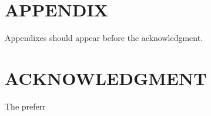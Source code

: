 \documentclass[letterpaper, 10 pt, conference]{ieeeconf}  %
\begin{document}






\section*{APPENDIX}

Appendixes should appear before the acknowledgment.

\section*{ACKNOWLEDGMENT}

The preferr






\end{document}
